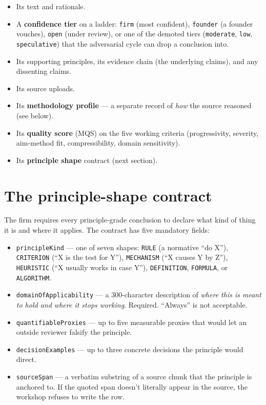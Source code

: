 \documentclass[11pt]{article}
\begin{document}
\begin{itemize}[leftmargin=*,itemsep=0.2em]
  \item Its text and rationale.
  \item A \textbf{confidence tier} on a ladder: \texttt{firm} (most
        confident), \texttt{founder} (a founder vouches), \texttt{open}
        (under review), or one of the demoted tiers
        (\texttt{moderate}, \texttt{low}, \texttt{speculative}) that
        the adversarial cycle can drop a conclusion into.
  \item Its supporting principles, its evidence chain (the underlying
        claims), and any dissenting claims.
  \item Its source uploads.
  \item Its \textbf{methodology profile} --- a separate record of
        \emph{how} the source reasoned (see below).
  \item Its \textbf{quality score} (MQS) on the five working criteria
        (progressivity, severity, aim-method fit, compressibility,
        domain sensitivity).
  \item Its \textbf{principle shape} contract (next section).
\end{itemize}

\section{The principle-shape contract}

The firm requires every principle-grade conclusion to declare what
kind of thing it is and where it applies. The contract has five
mandatory fields:

\begin{itemize}[leftmargin=*,itemsep=0.2em]
  \item \texttt{principleKind} --- one of seven shapes: \texttt{RULE}
        (a normative ``do X''), \texttt{CRITERION} (``X is the test
        for Y''), \texttt{MECHANISM} (``X causes Y by Z''),
        \texttt{HEURISTIC} (``X usually works in case Y''),
        \texttt{DEFINITION}, \texttt{FORMULA}, or \texttt{ALGORITHM}.
  \item \texttt{domainOfApplicability} --- a 300-character description
        of \emph{where this is meant to hold and where it stops
        working}. Required. ``Always'' is not acceptable.
  \item \texttt{quantifiableProxies} --- up to five measurable proxies
        that would let an outside reviewer falsify the principle.
  \item \texttt{decisionExamples} --- up to three concrete decisions
        the principle would direct.
  \item \texttt{sourceSpan} --- a verbatim substring of a source chunk
        that the principle is anchored to. If the quoted span doesn't
        literally appear in the source, the workshop refuses to write
        the row.
\end{itemize}
\end{document}
